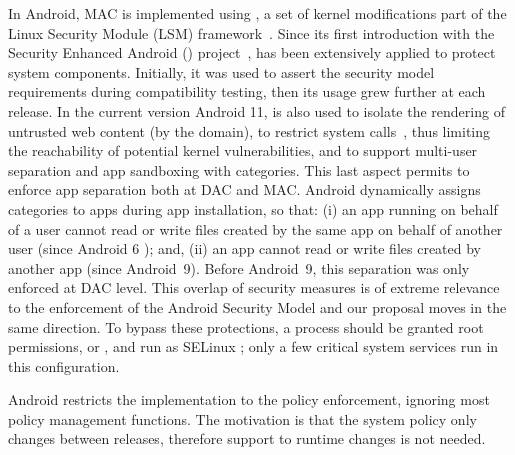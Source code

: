 In Android, MAC is implemented using \sea, a set of kernel
modifications part of the Linux Security Module (LSM)
framework~\cite{lsm_fra}.  Since its first introduction with the
Security Enhanced Android (\sea) project~\cite{seapp_seandroid}, \sel
has been extensively applied to protect system components.  Initially,
it was used to assert the security model requirements during
compatibility testing, then its usage grew further at each release.
In the current version Android 11, \sel is also used to isolate the
rendering of untrusted web content (by the \isolatedapp domain), to
restrict \ioctl system calls~\cite{seapp_restrioctly}, thus limiting
the reachability of potential kernel vulnerabilities, and to support
multi-user separation and app sandboxing with \sel categories.  This
last aspect permits to enforce app separation both at DAC and MAC.
Android dynamically assigns categories to apps during app
installation, so that: (i) an app running on behalf of a user cannot
read or write files created by the same app on behalf of another user
(since Android 6 \cite{seapp_android6_per_user}); and, (ii) an app
cannot read or write files created by another app (since
Android~9\cite{seapp_android9_per_app}).  Before Android~9, this
separation was only enforced at DAC level.  This overlap of security
measures is of extreme relevance to the enforcement of the Android
Security Model and our proposal moves in the same direction.  To
bypass these protections, a process should be granted root
permissions, \dacoverride or \dacreadsearch, and run as SELinux
\mlstrustedsubject; only a few critical system services run in this
configuration.

Android restricts the \sel implementation to the policy enforcement,
ignoring most policy management functions.  The motivation is that the
system policy only changes between releases, therefore support to
runtime changes is not needed.

